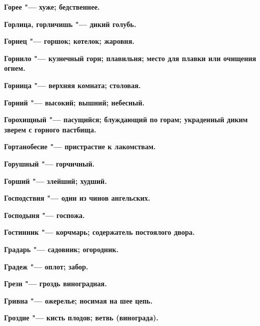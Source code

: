 \begin{mymulticols}{2}
\bfseries Горее\normalfont{} "--- хуже; бедственнее. 




\bfseries Горлица, горличишь\normalfont{} "--- дикий голубь. 




\bfseries Горнец\normalfont{} "--- горшок; котелок; жаровня. 




\bfseries Горнило\normalfont{} "--- кузнечный горн; плавильня; место для плавки или очищения огнем. 




\bfseries Горница\normalfont{} "--- верхняя комната; столовая. 




\bfseries Горний\normalfont{} "--- высокий; вышний; небесный. 




\bfseries Горохищный\normalfont{} "--- пасущийся; блуждающий по горам; украденный диким зверем с горного пастбища. 




\bfseries Гортанобесие\normalfont{} "--- пристрастие к лакомствам. 




\bfseries Горушный\normalfont{} "--- горчичный. 




\bfseries Горший\normalfont{} "--- злейший; худший. 




\bfseries Господствия\normalfont{} "--- один из чинов ангельских. 




\bfseries Господыня\normalfont{} "--- госпожа. 




\bfseries Гостинник\normalfont{} "--- корчмарь; содержатель постоялого двора. 




\bfseries Градарь\normalfont{} "--- садовник; огородник. 




\bfseries Градеж\normalfont{} "--- оплот; забор. 




\bfseries Грезн\normalfont{} "--- гроздь виноградная. 




\bfseries Гривна\normalfont{} "--- ожерелье; носимая на шее цепь. 




\bfseries Гроздие\normalfont{} "--- кисть плодов; ветвь (винограда). 





\end{mymulticols}
